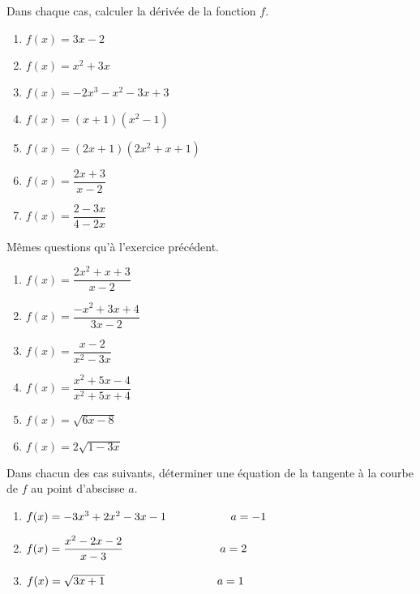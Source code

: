 



 \summary{}
 
	\begin{exercice}
 Dans chaque cas, calculer la dérivée de  la fonction $ f $. 

\begin{enumerate}
\item $f(x)=3x-2$
\item $f(x)=x^2+3x$
\item $f(x)=-2x^3-x^2-3x +3$
\item $f(x)=(x+1)(x^2-1)$
\item $f(x)=(2x+1)(2x^2+x+1)$
\item $f(x)=\dfrac{2x+3}{x-2}$
\item $f(x)=\dfrac{2-3x}{4-2x}$
\end{enumerate}
\end{exercice}

\begin{exercice}
 Mêmes questions qu'à l'exercice précédent. 

\begin{enumerate}
\item $f(x)=\dfrac{2x^2+x+3}{x-2}$
\item $f(x)=\dfrac{-x^2+3x+4}{3x-2}$

\item $f(x)=\dfrac{x-2}{x^2-3x}$
\item $f(x)=\dfrac{x^2+5x-4}{x^2+5x+4}$

\item $f(x)=\sqrt{6x-8}$
\item $f(x)=2\sqrt{1-3x}$
\end{enumerate}
\end{exercice}

\begin{exercice} Dans chacun des cas suivants, déterminer une équation de la tangente à la courbe  de $ f $ au point  d'abscisse $ a $.
\begin{enumerate}
\item $f(x)= -3x^3+2x^2-3x-1\hspace*{2cm}  a=-1 $

\item $f(x)= \dfrac{x^2-2x-2}{x-3}\hspace*{3cm}  a=2 $

\item $f(x)=\sqrt{3x+1}\hspace*{3.5cm}  a=1 $
\end{enumerate}
\end{exercice}

